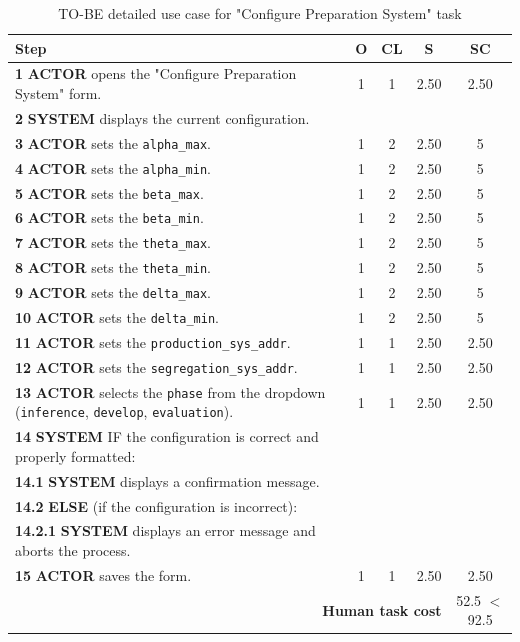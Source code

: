\begin{table}[H]
\centering
\begin{tabularx}{\textwidth}{|X|c|c|c|c|}
\hline
\textbf{Step} & \textbf{O} & \textbf{CL} & \textbf{S} & \textbf{SC} \\
\hline
\textbf{1} \textbf{ACTOR} opens the "Configure Preparation System" form. & 1 & 1 & 2.50 & 2.50 \\
\hline
\textbf{2} \textbf{SYSTEM} displays the current configuration. &  &  &  &  \\
\hline
\textbf{3} \textbf{ACTOR} sets the \texttt{alpha\_max}. & 1 & 2 & 2.50 & 5 \\
\hline
\textbf{4} \textbf{ACTOR} sets the \texttt{alpha\_min}. & 1 & 2 & 2.50 & 5 \\
\hline
\textbf{5} \textbf{ACTOR} sets the \texttt{beta\_max}. & 1 & 2 & 2.50 & 5 \\
\hline
\textbf{6} \textbf{ACTOR} sets the \texttt{beta\_min}. & 1 & 2 & 2.50 & 5 \\
\hline
\textbf{7} \textbf{ACTOR} sets the \texttt{theta\_max}. & 1 & 2 & 2.50 & 5 \\
\hline
\textbf{8} \textbf{ACTOR} sets the \texttt{theta\_min}. & 1 & 2 & 2.50 & 5 \\
\hline
\textbf{9} \textbf{ACTOR} sets the \texttt{delta\_max}. & 1 & 2 & 2.50 & 5 \\
\hline
\textbf{10} \textbf{ACTOR} sets the \texttt{delta\_min}. & 1 & 2 & 2.50 & 5 \\
\hline
\textbf{11} \textbf{ACTOR} sets the \texttt{production\_sys\_addr}. & 1 & 1 & 2.50 & 2.50 \\
\hline
\textbf{12} \textbf{ACTOR} sets the \texttt{segregation\_sys\_addr}. & 1 & 1 & 2.50 & 2.50 \\
\hline
\textbf{13} \textbf{ACTOR} selects the \texttt{phase} from the dropdown (\texttt{inference}, \texttt{develop}, \texttt{evaluation}). & 1 & 1 & 2.50 & 2.50 \\
\hline
\textbf{14} \textbf{SYSTEM} {IF} the configuration is correct and properly formatted: &  &  &  &  \\
\hline
\textbf{14.1} \textbf{SYSTEM} displays a confirmation message. & & & &  \\
\hline
\textbf{14.2} \textbf{ELSE} (if the configuration is incorrect): & & &  &  \\
\hline
\textbf{14.2.1} \textbf{SYSTEM} displays an error message and aborts the process. &  &  &  &  \\
\hline
\textbf{15} \textbf{ACTOR} saves the form. & 1 & 1 & 2.50 & 2.50 \\
\hline
\multicolumn{4}{|r|}{\textbf{Human task cost}} & 52.5 $ < $ 92.5 \\
\hline
\end{tabularx}
\caption{TO-BE detailed use case for "Configure Preparation System" task}
\label{table:to_be_configure_preparation_system}
\end{table}


